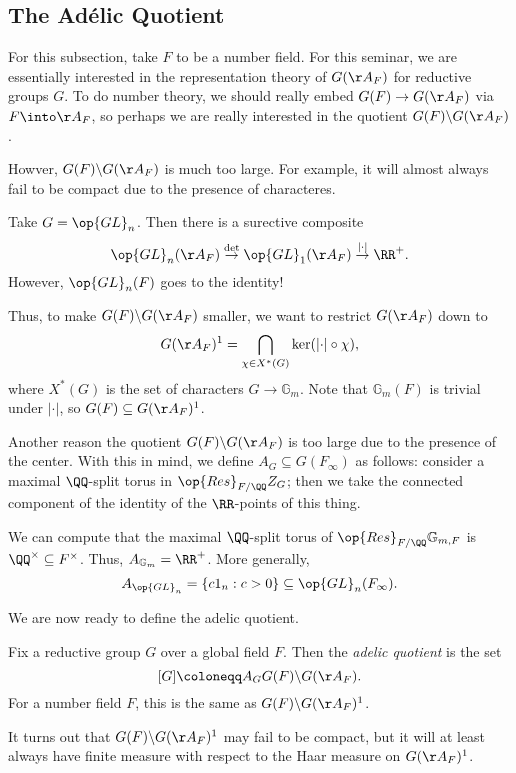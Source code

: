 \documentclass{article}
\begin{document}
\subsection{The Ad\'elic Quotient}
For this subsection, take $F$ to be a number field. For this seminar, we are essentially interested in the representation theory of $G(\AA_F)$ for reductive groups $G$. To do number theory, we should really embed $G(F)\to G(\AA_F)$ via $F\into\AA_F$, so perhaps we are really interested in the quotient $G(F)\backslash G(\AA_F)$.

Howver, $G(F)\backslash G(\AA_F)$ is much too large. For example, it will almost always fail to be compact due to the presence of characteres.
\begin{example}
	Take $G=\op{GL}_n$. Then there is a surective composite
	\[\op{GL}_n(\AA_F)\stackrel\det\to\op{GL}_1(\AA_F)\stackrel{\left|\cdot\right|}\to\RR^+.\]
	However, $\op{GL}_n(F)$ goes to the identity!
\end{example}
Thus, to make $G(F)\backslash G(\AA_F)$ smaller, we want to restrict $G(\AA_F)$ down to
\[G(\AA_F)^1=\bigcap_{\chi\in X^*(G)}\ker(\left|\cdot\right|\circ\chi),\]
where $X^*(G)$ is the set of characters $G\to\mathbb G_m$. Note that $\mathbb G_m(F)$ is trivial under $\left|\cdot\right|$, so $G(F)\subseteq G(\AA_F)^1$.

Another reason the quotient $G(F)\backslash G(\AA_F)$ is too large due to the presence of the center. With this in mind, we define $A_G\subseteq G(F_\infty)$ as follows: consider a maximal $\QQ$-split torus in $\op{Res}_{F/\QQ}Z_G$; then we take the connected component of the identity of the $\RR$-points of this thing.
\begin{example}
	We can compute that the maximal $\QQ$-split torus of $\op{Res}_{F/\QQ}\mathbb G_{m,F}$ is $\QQ^\times\subseteq F^\times$. Thus, $A_{\mathbb G_m}=\RR^+$. More generally,
	\[A_{\op{GL}_n}=\{c1_n:c>0\}\subseteq\op{GL}_n(F_\infty).\]
\end{example}
We are now ready to define the adelic quotient.
\begin{definition}
	Fix a reductive group $G$ over a global field $F$. Then the \textit{adelic quotient} is the set
	\[[G]\coloneqq A_GG(F)\backslash G(\AA_F).\]
	For a number field $F$, this is the same as $G(F)\backslash G(\AA_F)^1$.
\end{definition}
\begin{remark}
	It turns out that $G(F)\backslash G(\AA_F)^1$ may fail to be compact, but it will at least always have finite measure with respect to the Haar measure on $G(\AA_F)^1$.
\end{remark}
\end{document}
